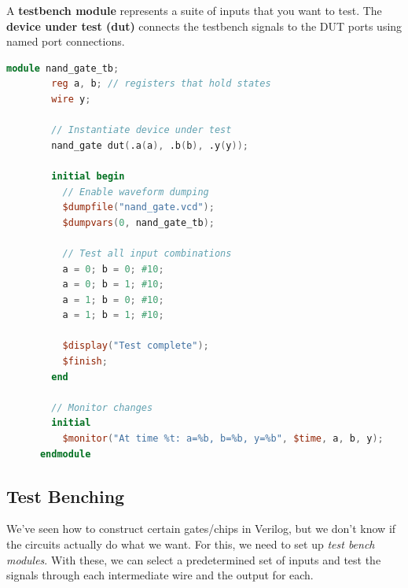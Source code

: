   \begin{definition}
    A \textbf{testbench module} represents a suite of inputs that you want to test. The \textbf{device under test (dut)} connects the testbench signals to the DUT ports using named port connections. 

    \begin{lstlisting}[language=Verilog]
      module nand_gate_tb;
        reg a, b; // registers that hold states
        wire y;

        // Instantiate device under test
        nand_gate dut(.a(a), .b(b), .y(y));

        initial begin
          // Enable waveform dumping
          $dumpfile("nand_gate.vcd");
          $dumpvars(0, nand_gate_tb);

          // Test all input combinations
          a = 0; b = 0; #10;
          a = 0; b = 1; #10;
          a = 1; b = 0; #10;
          a = 1; b = 1; #10;

          $display("Test complete");
          $finish;
        end

        // Monitor changes
        initial
          $monitor("At time %t: a=%b, b=%b, y=%b", $time, a, b, y);
      endmodule
    \end{lstlisting}
  \end{definition}

\subsection{Test Benching}

  We've seen how to construct certain gates/chips in Verilog, but we don't know if the circuits actually do what we want. For this, we need to set up \textit{test bench modules}. With these, we can select a predetermined set of inputs and test the signals through each intermediate wire and the output for each. 

